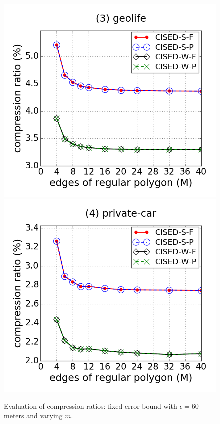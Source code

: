 \begin{figure}[tb!]
\includegraphics[scale = 0.250]{figures/Exp-M-e-60-CR-geolife.png}
\includegraphics[scale = 0.250]{figures/Exp-M-e-60-CR-private.png}
\vspace{-2ex}
\caption{\small Evaluation of compression ratios: fixed error bound with $\epsilon=60$ meters and varying $m$.}
\label{fig:m-cr-e60}
\vspace{-1ex}
\end{figure}



